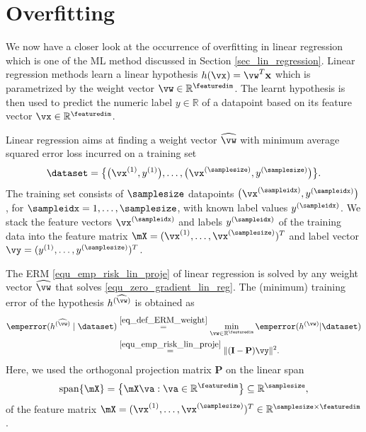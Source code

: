 \documentclass[12pt]{report}
\newcommand{\featurelen}{\featuredim}
\begin{document}



\section{Overfitting}
\label{sec_overfitting_sec_6}

We now have a closer look at the occurrence of overfitting in linear regression which is 
one of the ML method discussed in Section \ref{sec_lin_regression}. Linear regression 
methods learn a linear hypothesis $h(\vx) = \vw^{T} \mathbf{x}$ which is parametrized by the 
weight vector $\vw \in \mathbb{R}^{\featurelen}$. The learnt hypothesis is then used to predict the 
numeric label $y \in \mathbb{R}$ of a datapoint based on its feature vector $\vx \in \mathbb{R}^{\featurelen}$. 

Linear regression aims at finding a weight vector $\widehat{\vw}$ with minimum 
average squared error loss incurred on a training set 
 $$\dataset = \big\{ \big(\vx^{(1)},y^{(1)}\big),\ldots,\big(\vx^{(\samplesize)},y^{(\samplesize)}\big)  \big\}.$$ 
The training set consists of $\samplesize$ datapoints $\big(\vx^{(\sampleidx)},y^{(\sampleidx)}\big)$, 
for $\sampleidx=1,\ldots,\samplesize$, with known label values $y^{(\sampleidx)}$. 
We stack the feature vectors $\vx^{(\sampleidx)}$ and labels $y^{(\sampleidx)}$ of 
the training data into the feature matrix $\mX=(\vx^{(1)},\ldots,\vx^{(\samplesize)})^{T}$ 
and label vector $\vy=(y^{(1)},\ldots,y^{(\samplesize)})^{T}$. 

The ERM \eqref{equ_emp_risk_lin_proje} of linear regression is solved by any weight vector $\widehat{\vw}$ 
that solves \eqref{equ_zero_gradient_lin_reg}. The (minimum) training error of the hypothesis $h^{(\widehat{\vw})}$ 
is obtained as 
\begin{align}
\emperror(h^{(\widehat{\vw})} \mid \dataset) & \stackrel{\eqref{eq_def_ERM_weight}}{=} 
  \min_{\vw \in \mathbb{R}^{\featuredim}} \emperror(h^{(\vw)} | \dataset) \nonumber \\ 
& \stackrel{\eqref{equ_emp_risk_lin_proje}}{=} \|  (\mathbf{I}- \mathbf{P}) \vy \|^{2}.
\end{align} 
Here, we used the orthogonal projection matrix $\mathbf{P}$ on the linear span 
\begin{equation} 
\nonumber
{\rm span}\{ \mX \} = \big\{  \mX \va : \va \in \mathbb{R}^{\featuredim} \big\} \subseteq \mathbb{R}^{\samplesize} , 
\end{equation}
of the feature matrix $\mX = (\vx^{(1)},\ldots,\vx^{(\samplesize)})^{T} \in \mathbb{R}^{  \samplesize \times \featuredim}$. 
\end{document}
